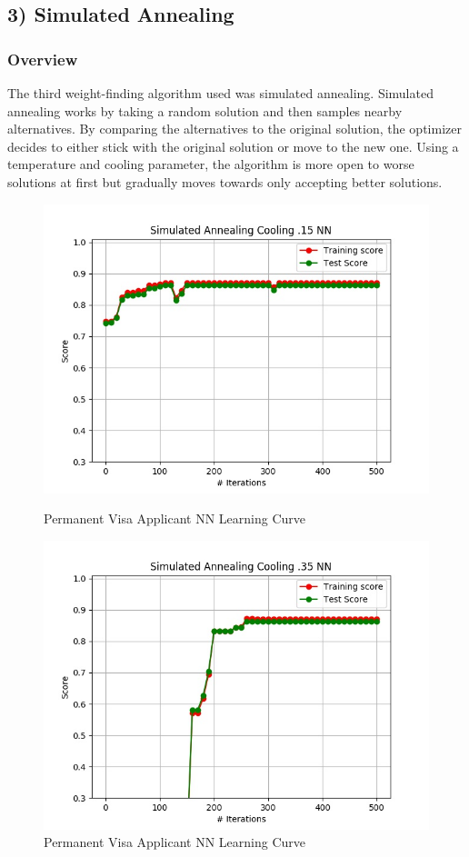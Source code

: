 \documentclass[h]{article}
\begin{document}
\subsection*{3) Simulated Annealing}  
\subsubsection*{Overview}
The third weight-finding algorithm used was simulated annealing.  Simulated 
annealing works by taking a random solution and then samples nearby 
alternatives.  By comparing the alternatives to the original solution, the 
optimizer decides to either stick with the original solution or move to the new 
one.  Using a temperature and cooling parameter, the algorithm is more open to 
worse solutions at first but gradually moves towards only accepting better 
solutions.

 \begin{figure}[H]
      \includegraphics[width=1\textwidth,keepaspectratio]{simulated_annealing_cooling_pt15_nn.jpg} 
      \caption*{Permanent Visa Applicant NN Learning Curve} 
   \endminipage\hfill
      \includegraphics[width=1\textwidth,keepaspectratio]{simulated_annealing_cooling_pt35_nn.jpg} 
      \caption*{Permanent Visa Applicant NN Learning Curve} 
   \endminipage\hfill
\end{figure}
\end{document}
